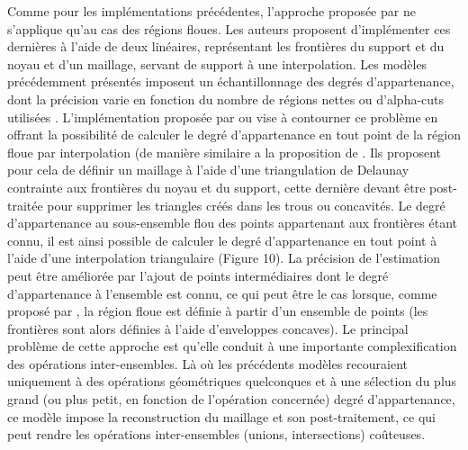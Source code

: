 Comme pour les implémentations précédentes, l’approche proposée par
\textcite{Dilo2007} ne s’applique qu’au cas des régions floues. Les
auteurs proposent d’implémenter ces dernières à l’aide de deux
linéaires, représentant les frontières du support et du noyau et d’un
maillage, servant de support à une interpolation. Les modèles
précédemment présentés imposent un échantillonnage des degrés
d’appartenance, dont la précision varie en fonction du nombre de
régions nettes \autocite{Kanjilal2010} ou d’alpha-cuts utilisées
\autocite{Zoghlami2016}. L’implémentation proposée par
\textcite{Zoghalmi2013,Zoghalmi2016} ou \textcite{de Runz2008} vise à
contourner ce problème en offrant la possibilité de calculer le degré
d’appartenance en tout point de la région floue par interpolation (de
manière similaire a la proposition de \textcite{Tossebro2002}. Ils
proposent pour cela de définir un maillage à l’aide d’une
triangulation de Delaunay contrainte aux frontières du noyau et du
support, cette dernière devant être post-traitée pour supprimer les
triangles créés dans les trous ou concavités. Le degré d’appartenance
au sous-ensemble flou des points appartenant aux frontières étant
connu, il est ainsi possible de calculer le degré d’appartenance en
tout point à l’aide d’une interpolation triangulaire (Figure 10). La
précision de l’estimation peut être améliorée par l’ajout de points
intermédiaires dont le degré d’appartenance à l’ensemble est connu, ce
qui peut être le cas lorsque, comme proposé par \textcite{Dilo2007},
la région floue est définie à partir d’un ensemble de points (les
frontières sont alors définies à l’aide d’enveloppes concaves). Le
principal problème de cette approche est qu’elle conduit à une
importante complexification des opérations inter-ensembles. Là où les
précédents modèles recouraient uniquement à des opérations
géométriques quelconques et à une sélection du plus grand (ou plus
petit, en fonction de l’opération concernée) degré d’appartenance, ce
modèle impose la reconstruction du maillage et son post-traitement, ce
qui peut rendre les opérations inter-ensembles (unions, intersections)
coûteuses.


